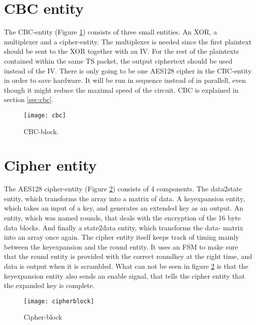 \section{CBC entity}
The CBC-entity (Figure \ref{block:cbc}) consists of three small 
entities. An XOR, a multiplexer and a cipher-entity. The multiplexer 
is needed since the first plaintext should be sent to the XOR together 
with an IV. For the rest of the plaintexts contained within the same 
TS packet, the output ciphertext should be used instead of the IV. 
There is only going to be one AES128 cipher in the CBC-entity in 
order to save hardware. It will be run in sequence instead of in 
parallell, even though it might reduce the maximal speed of the 
circuit. CBC is explained in section \ref{sec:cbc}.

\begin{figure}[h!]
  \centering
  \texttt{[image: cbc]}
  \caption{CBC-block.}
  \label{block:cbc}
\end{figure}

\section{Cipher entity}
The AES128 cipher-entity (Figure \ref{block:cipher}) consists of 4 
components. The data2state entity, which transforms the array into a 
matrix of data. A keyexpansion entity, which takes an input of a key, 
and generates an extended key as an output. An entity, which was 
named rounds, that deals with the encryption of the 16 byte data 
blocks. And finally a state2data entity, which transforms the data-
matrix into an array once again. The cipher entity itself keeps track 
of timing mainly between the keyexpansion and the round entity. It 
uses an FSM to make sure that the round entity is provided with the 
correct roundkey at the right time, and data is output when 
it is scrambled. What can not be seen in figure \ref{block:cipher} is 
that the keyexpansion entity also sends an enable signal, that tells 
the cipher entity that the expanded key is complete.

\begin{figure}[h!]
  \centering
  \texttt{[image: cipherblock]}
  \caption{Cipher-block}
  \label{block:cipher}
\end{figure}

